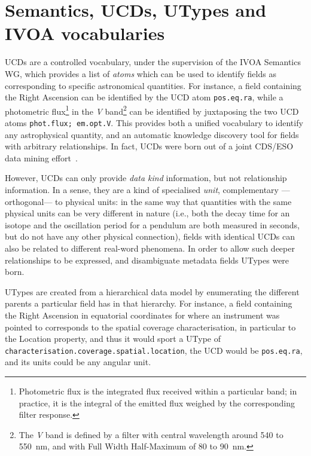 	
	\section{Semantics, UCDs, UTypes and IVOA vocabularies} %
	\label{sub:ucds_and_utypes}
		\newcommand{\ucdurl}[0]
		{http://www.ivoa.net/Documents/latest/ UCDlist.html}
		UCDs are a controlled vocabulary\urlnote{\ucdurl}, under
		the supervision of the IVOA Semantics WG, which provides a
		list of \emph{atoms} which can be used to identify fields
		as corresponding to specific astronomical quantities. For
		instance, a field containing the Right Ascension can be
		identified by the UCD atom \texttt{pos.eq.ra}, while a
		photometric flux\footnote{Photometric flux is the
		integrated flux received within a particular band; in
		practice, it is the integral of the emitted flux weighed by
		the corresponding filter response.} in the \emph{V}
		band\footnote{The \emph{V} band is defined by a filter with
		central wavelength around 540 to 550~nm, and with Full
		Width Half-Maximum of 80 to 90~nm.} can be identified by
		juxtaposing
		the two UCD atoms \texttt{phot.flux; em.opt.V}. This
		provides both a unified vocabulary to identify any
		astrophysical quantity, and an automatic knowledge
		discovery tool for fields with arbitrary relationships. In
		fact, UCDs were born out of a joint CDS/ESO data mining
		effort~\cite{1999ASPC..172..379O}.
		
		 However, UCDs can only provide \emph{data kind}
		information, but not relationship information. In a sense,
		they are a kind of specialised \emph{unit}, complementary
		---orthogonal--- to physical units: in the same way that
		quantities with the same physical units can be very
		different in nature (i.e., both the decay time for an
		isotope and the oscillation period for a pendulum are both
		measured in seconds, but do not have any other physical
		connection), fields with identical UCDs can also be related
		to different real-word phenomena. In order to allow such
		deeper relationships to be expressed, and disambiguate
		metadata fields UTypes were born.
		
		 UTypes are created from a hierarchical data model by
		enumerating the different parents a particular field has in
		that hierarchy. For instance, a field containing the Right
		Ascension in equatorial coordinates for where an instrument
		was pointed to corresponds to the spatial coverage
		characterisation, in particular to the Location property,
		and thus it would sport a UType of
		\texttt{characterisation.coverage.spa\-tial.lo\-ca\-tion},
		the UCD would be \texttt{pos.eq.ra}, and its units could be
		any angular unit.
		
